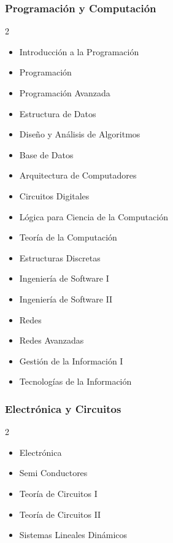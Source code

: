 \documentclass[12pt,a4paper]{article}
\begin{document}
	\subsubsection{Programación y Computación}
	\begin{multicols}{2}
		\begin{itemize}
			\item Introducción a la Programación
			\item Programación
			\item Programación Avanzada
			\item Estructura de Datos
			\item Diseño y Análisis de Algoritmos
			\item Base de Datos
			\item Arquitectura de Computadores
			\item Circuitos Digitales
			\item Lógica para Ciencia de la Computación
			\item Teoría de la Computación
			\item Estructuras Discretas
			\item Ingeniería de Software I
			\item Ingeniería de Software II
			\item Redes
			\item Redes Avanzadas
			\item Gestión de la Información I
			\item Tecnologías de la Información
		\end{itemize}
	\end{multicols}
	
	\subsubsection{Electrónica y Circuitos}
	\begin{multicols}{2}
		\begin{itemize}
			\item Electrónica
			\item Semi Conductores
			\item Teoría de Circuitos I
			\item Teoría de Circuitos II
			\item Sistemas Lineales Dinámicos
		\end{itemize}
	\end{multicols}
	
\end{document}
